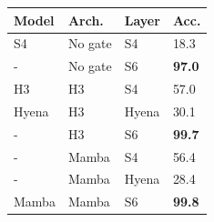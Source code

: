 \begin{tabular}{llll}
\hline
Model & Arch. & Layer & Acc. \\
\hline
S4 & No gate & S4 & 18.3 \\
- & No gate & S6 & \textbf{97.0} \\
\hline
H3 & H3 & S4 & 57.0 \\
Hyena & H3 & Hyena & 30.1 \\
- & H3 & S6 & \textbf{99.7} \\
\hline
- & Mamba & S4 & 56.4 \\
- & Mamba & Hyena & 28.4 \\
Mamba & Mamba & S6 & \textbf{99.8} \\
\hline
\end{tabular}
